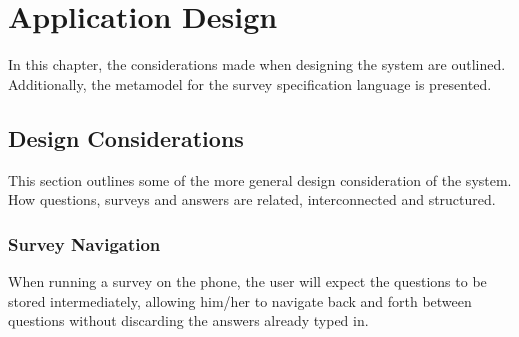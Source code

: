 \chapter{Application Design}
\label{chap:design}
In this chapter, the considerations made when designing the system are outlined. Additionally, the metamodel for the survey specification language is presented.

\section{Design Considerations}
\label{sec:designconsiderations}
This section outlines some of the more general design consideration of the system. How questions, surveys and answers are related, interconnected and structured.

\subsection{Survey Navigation}
\label{subsec:surveynavigation}
When running a survey on the phone, the user will expect the questions to be stored intermediately, allowing him/her to navigate back and forth between questions without discarding the answers already typed in.

